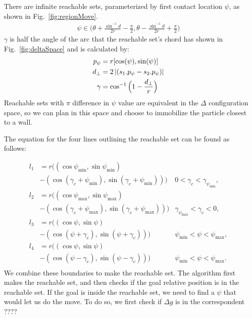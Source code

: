 There are infinite reachable sets, parameterized by first contact location $\psi$, as shown in Fig.~\ref{fig:regionMove}.
\begin{align}
 \psi \in \Big(\theta +\frac{\sin^{-1}{d}}{2r} - \frac{\pi}{2}, \theta -\frac{\sin^{-1}{d}}{2r} + \frac{\pi}{2}\Big)
\end{align}
$\gamma$ is half the angle of the arc that the reachable set's chord has shown in Fig.~\ref{fig:deltaSpace} and is calculated by:
\begin{align}
p_\psi &= r[\cos(\psi ), \sin(\psi )]\\
d_\perp&= 2 \left\lvert(s_1.p_\psi - s_2.p_\psi)\right\rvert\\
\gamma &= \cos^{-1} \Big(1-\frac{d_\perp}{r} \Big)
\end{align}
Reachable sets with $\pi$ difference in $\psi$ value are equivalent in the  $\Delta$ configuration space, so we can plan in this space and choose to immobilize the particle closest to a wall. 

The equation for the four lines outlining the reachable set can be found as follows:

\begin{align}\nonumber
l_1 &=  r \Big((\cos\psi_{\min}, \sin\psi_{\min})\\ \nonumber
& - (\cos(\gamma_c + \psi_{\min}), \sin(\gamma_c + \psi_{\min}))\Big) &  0<\gamma_c< \gamma_{\psi_{\min}},\\ \nonumber
l_2 &=  r \Big((\cos\psi_{\max}, \sin\psi_{\max})\\ \nonumber
& - (\cos(\gamma_c + \psi_{\max}), \sin(\gamma_c + \psi_{\max}))\Big) &  \gamma_{\psi_{\max}}<\gamma_c< 0,\\  \nonumber
l_3 &=  r \Big((\cos\psi, \sin\psi)\\ \nonumber
& - (\cos( \psi+\gamma_c ), \sin( \psi+ \gamma_c))\Big) &  \psi_{\min}<\psi< \psi_{\max},\\ \nonumber
l_4 &=  r \Big((\cos\psi, \sin\psi)\\ \nonumber
& - (\cos( \psi-\gamma_c ), \sin( \psi- \gamma_c))\Big) &  \psi_{\min}<\psi< \psi_{\max}.\\ \nonumber
\end{align}
We combine these boundaries to make the reachable set. 
The algorithm first makes the reachable set, and then checks if the goal relative position is in the reachable set. If the goal is inside the reachable set, we need to find a $\psi$ that would let us do the move. To do so, we first check if $\Delta g$ is in the correspondent ???? 

